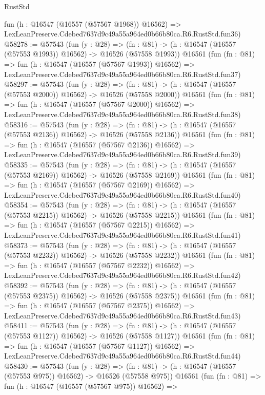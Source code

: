 \begin{lexlean}{RustStd}
\begin{coremodule}
    fun (h : @16547 (@16557 (@57567 @1968)) @16562) =>
    LexLeanPreserve.Cdebed7637d9c49a55a964ed0b66b80ca.R6.RustStd.fun36)
@58278 := @57543
    (fun (y : @28) =>
    (fn : @81) -> (h : @16547 (@16557 (@57553 @1993)) @16562) -> @16526 (@57558 @1993))
    @16561
    (fun (fn : @81) =>
    fun (h : @16547 (@16557 (@57567 @1993)) @16562) =>
    LexLeanPreserve.Cdebed7637d9c49a55a964ed0b66b80ca.R6.RustStd.fun37)
@58297 := @57543
    (fun (y : @28) =>
    (fn : @81) -> (h : @16547 (@16557 (@57553 @2000)) @16562) -> @16526 (@57558 @2000))
    @16561
    (fun (fn : @81) =>
    fun (h : @16547 (@16557 (@57567 @2000)) @16562) =>
    LexLeanPreserve.Cdebed7637d9c49a55a964ed0b66b80ca.R6.RustStd.fun38)
@58316 := @57543
    (fun (y : @28) =>
    (fn : @81) -> (h : @16547 (@16557 (@57553 @2136)) @16562) -> @16526 (@57558 @2136))
    @16561
    (fun (fn : @81) =>
    fun (h : @16547 (@16557 (@57567 @2136)) @16562) =>
    LexLeanPreserve.Cdebed7637d9c49a55a964ed0b66b80ca.R6.RustStd.fun39)
@58335 := @57543
    (fun (y : @28) =>
    (fn : @81) -> (h : @16547 (@16557 (@57553 @2169)) @16562) -> @16526 (@57558 @2169))
    @16561
    (fun (fn : @81) =>
    fun (h : @16547 (@16557 (@57567 @2169)) @16562) =>
    LexLeanPreserve.Cdebed7637d9c49a55a964ed0b66b80ca.R6.RustStd.fun40)
@58354 := @57543
    (fun (y : @28) =>
    (fn : @81) -> (h : @16547 (@16557 (@57553 @2215)) @16562) -> @16526 (@57558 @2215))
    @16561
    (fun (fn : @81) =>
    fun (h : @16547 (@16557 (@57567 @2215)) @16562) =>
    LexLeanPreserve.Cdebed7637d9c49a55a964ed0b66b80ca.R6.RustStd.fun41)
@58373 := @57543
    (fun (y : @28) =>
    (fn : @81) -> (h : @16547 (@16557 (@57553 @2232)) @16562) -> @16526 (@57558 @2232))
    @16561
    (fun (fn : @81) =>
    fun (h : @16547 (@16557 (@57567 @2232)) @16562) =>
    LexLeanPreserve.Cdebed7637d9c49a55a964ed0b66b80ca.R6.RustStd.fun42)
@58392 := @57543
    (fun (y : @28) =>
    (fn : @81) -> (h : @16547 (@16557 (@57553 @2375)) @16562) -> @16526 (@57558 @2375))
    @16561
    (fun (fn : @81) =>
    fun (h : @16547 (@16557 (@57567 @2375)) @16562) =>
    LexLeanPreserve.Cdebed7637d9c49a55a964ed0b66b80ca.R6.RustStd.fun43)
@58411 := @57543
    (fun (y : @28) =>
    (fn : @81) -> (h : @16547 (@16557 (@57553 @1127)) @16562) -> @16526 (@57558 @1127))
    @16561
    (fun (fn : @81) =>
    fun (h : @16547 (@16557 (@57567 @1127)) @16562) =>
    LexLeanPreserve.Cdebed7637d9c49a55a964ed0b66b80ca.R6.RustStd.fun44)
@58430 := @57543
    (fun (y : @28) =>
    (fn : @81) -> (h : @16547 (@16557 (@57553 @975)) @16562) -> @16526 (@57558 @975))
    @16561
    (fun (fn : @81) =>
    fun (h : @16547 (@16557 (@57567 @975)) @16562) =>

\end{coremodule}
\end{lexlean}
